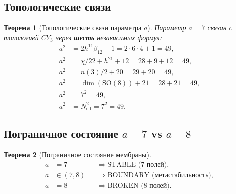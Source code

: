 \documentclass[11pt,a4paper]{article}
\newcommand{\SO}{\mathrm{SO}}
\newcommand{\CY}{CY_3}
\newtheorem{theorem}{Теорема}[section]
\theoremstyle{definition}
\begin{document}
\subsection{Топологические связи}

\begin{theorem}[Топологические связи параметра $a$]
\label{thm:membrane-topology-review}
Параметр $a = 7$ связан с топологией $\CY$ через 
\textbf{шесть} независимых формул:
\begin{align}
    a^2 &= 2 h^{11} \beta_{12} + 1 = 2 \cdot 6 \cdot 4 + 1 = 49, \\
    a^2 &= \chi/22 + h^{21} + 12 = 28 + 9 + 12 = 49, \\
    a^2 &= n(3)/2 + 20 = 29 + 20 = 49, \\
    a^2 &= \dim(\SO(8)) + 21 = 28 + 21 = 49, \\
    a^2 &= 7^2 = 49, \\
    a^2 &= N_{\text{eff}}^2 = 7^2 = 49.
\end{align}
\end{theorem}

\subsection{Пограничное состояние $a = 7$ vs $a = 8$}

\begin{theorem}[Пограничное состояние мембраны]
\label{thm:membrane-boundary-review}
\begin{equation}
    \boxed{
    \begin{aligned}
        a &= 7 &&\Rightarrow \text{STABLE (7 полей)}, \\
        a &\in (7, 8) &&\Rightarrow \text{BOUNDARY (метастабильность)}, \\
        a &= 8 &&\Rightarrow \text{BROKEN (8 полей)}.
    \end{aligned}}
    \label{eq:membrane-boundary-review}
\end{equation}
\end{theorem}
\end{document}
